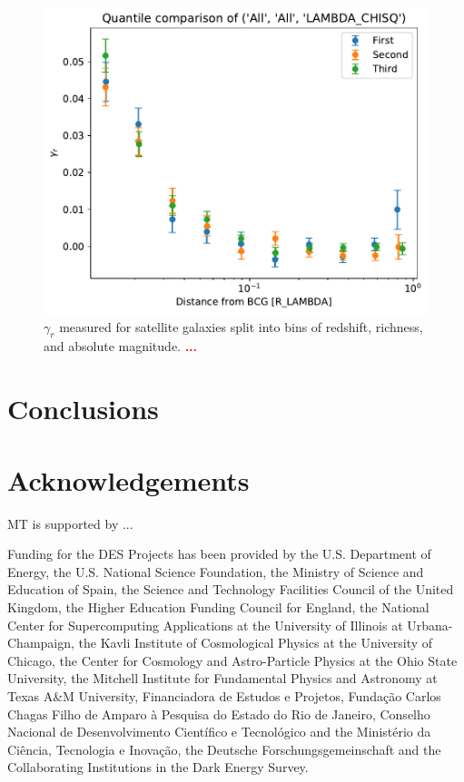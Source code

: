 \documentclass[fleqn,usenatbib]{mnras}
\newcommand{\verify}[1]{\textcolor{red}{\textbf{{#1}}}}
\begin{document}
\begin{figure}
\begin{center}
\includegraphics[width=\columnwidth]{zhou_lambda_tertile.pdf}
\end{center}
\caption[]{$\gamma_r$ measured for satellite galaxies split into bins of redshift, richness, and absolute magnitude. \verify{...}
\label{fig:gammar2}}
\end{figure}



\section{Conclusions}



\section*{Acknowledgements}

MT is supported by ... 

Funding for the DES Projects has been provided by the U.S. Department of Energy, the U.S. National Science Foundation, the Ministry of Science and Education of Spain, 
the Science and Technology Facilities Council of the United Kingdom, the Higher Education Funding Council for England, the National Center for Supercomputing 
Applications at the University of Illinois at Urbana-Champaign, the Kavli Institute of Cosmological Physics at the University of Chicago, 
the Center for Cosmology and Astro-Particle Physics at the Ohio State University,
the Mitchell Institute for Fundamental Physics and Astronomy at Texas A\&M University, Financiadora de Estudos e Projetos, 
Funda{\c c}{\~a}o Carlos Chagas Filho de Amparo {\`a} Pesquisa do Estado do Rio de Janeiro, Conselho Nacional de Desenvolvimento Cient{\'i}fico e Tecnol{\'o}gico and 
the Minist{\'e}rio da Ci{\^e}ncia, Tecnologia e Inova{\c c}{\~a}o, the Deutsche Forschungsgemeinschaft and the Collaborating Institutions in the Dark Energy Survey. 
\end{document}
